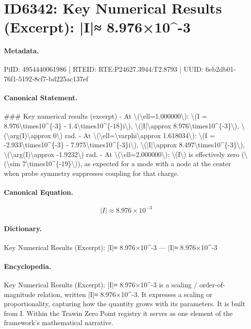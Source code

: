 \section*{ID6342: Key Numerical Results (Excerpt): |I|≈ 8.976×10\textasciicircum{}-3}
\paragraph{Metadata.}
PiID: 4954440061986 | RTEID: RTE:P24627.3944:T2.8793 | UUID: 6eb2db01-76f1-5192-8cf7-bd225ac137ef

\paragraph{Canonical Statement.}
\#\#\# Key numerical results (excerpt) - At \textbackslash{}(\textbackslash{}ell=1.000000\textbackslash{}): \textbackslash{}(I = 8.976\textbackslash{}times10\textasciicircum{}\{-3\} - 1.4\textbackslash{}times10\textasciicircum{}\{-18\}i\textbackslash{}), \textbackslash{}(|I|\textbackslash{}approx 8.976\textbackslash{}times10\textasciicircum{}\{-3\}\textbackslash{}), \textbackslash{}(\textbackslash{}arg(I)\textbackslash{}approx 0\textbackslash{}) rad. - At \textbackslash{}(\textbackslash{}ell=\textbackslash{}varphi\textbackslash{}approx 1.618034\textbackslash{}): \textbackslash{}(I = -2.933\textbackslash{}times10\textasciicircum{}\{-3\} - 7.975\textbackslash{}times10\textasciicircum{}\{-3\}i\textbackslash{}), \textbackslash{}(|I|\textbackslash{}approx 8.497\textbackslash{}times10\textasciicircum{}\{-3\}\textbackslash{}), \textbackslash{}(\textbackslash{}arg(I)\textbackslash{}approx -1.9232\textbackslash{}) rad. - At \textbackslash{}(\textbackslash{}ell=2.000000\textbackslash{}): \textbackslash{}(I\textbackslash{}) is effectively zero (\textbackslash{}(\textbackslash{}sim 7\textbackslash{}times10\textasciicircum{}\{-19\}\textbackslash{})), as expected for a mode with a node at the center when probe symmetry suppresses coupling for that charge.

\paragraph{Canonical Equation.}
\[
|I|\approx 8.976\times10^{-3}
\]

\paragraph{Dictionary.}
Key Numerical Results (Excerpt): |I|≈ 8.976×10\textasciicircum{}-3 — |I|≈ 8.976×10\textasciicircum{}-3

\paragraph{Encyclopedia.}
Key Numerical Results (Excerpt): |I|≈ 8.976×10\textasciicircum{}-3 is a scaling / order-of-magnitude relation, written |I|≈ 8.976×10\textasciicircum{}-3. It expresses a scaling or proportionality, capturing how the quantity grows with its parameters. It is built from I. Within the Trawin Zero Point registry it serves as one element of the framework's mathematical narrative.
